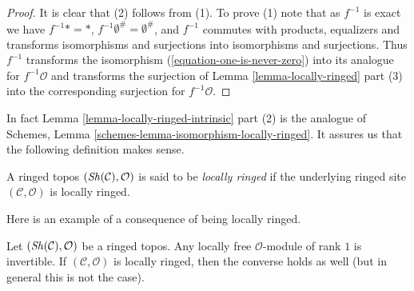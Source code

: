 \begin{proof}
It is clear that (2) follows from (1). To prove (1) note that
as $f^{-1}$ is exact we have $f^{-1}* = *$,
$f^{-1}\emptyset^\# = \emptyset^\#$, and $f^{-1}$ commutes with
products, equalizers and transforms isomorphisms and surjections
into isomorphisms and surjections. Thus $f^{-1}$ transforms the
isomorphism (\ref{equation-one-is-never-zero}) into
its analogue for $f^{-1}\mathcal{O}$ and transforms the surjection of
Lemma \ref{lemma-locally-ringed} part (3)
into the corresponding surjection for $f^{-1}\mathcal{O}$.
\end{proof}

\noindent
In fact
Lemma \ref{lemma-locally-ringed-intrinsic} part (2)
is the analogue of
Schemes, Lemma \ref{schemes-lemma-isomorphism-locally-ringed}.
It assures us that the following definition makes sense.

\begin{definition}
\label{definition-locally-ringed-topos}
A ringed topos $(\mathop{\mathit{Sh}}\nolimits(\mathcal{C}), \mathcal{O})$ is said to be
{\it locally ringed} if the underlying ringed site
$(\mathcal{C}, \mathcal{O})$ is locally ringed.
\end{definition}

\noindent
Here is an example of a consequence of being locally ringed.

\begin{lemma}
\label{lemma-invertible-is-locally-free-rank-1}
Let $(\mathop{\mathit{Sh}}\nolimits(\mathcal{C}), \mathcal{O})$ be a ringed topos. Any locally free
$\mathcal{O}$-module of rank $1$ is invertible.
If $(\mathcal{C}, \mathcal{O})$ is locally ringed, then
the converse holds as well (but in general this is not the case).
\end{lemma}

